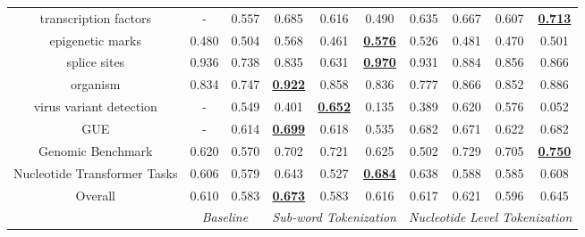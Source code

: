 \begin{table*}[]
\begin{center}
\begin{tabular}{@{}c|cc|ccc|cccc@{}}
transcription factors & - & 0.557 & 0.685 & 0.616 & 0.490 & 0.635 & 0.667 & 0.607 & \textbf{\underline{0.713}} \\
epigenetic marks & 0.480 & 0.504 & 0.568 & 0.461 & \textbf{\underline{0.576}} & 0.526 & 0.481 & 0.470 & 0.501 \\
splice sites & 0.936 & 0.738 & 0.835 & 0.631 & \textbf{\underline{0.970}} & 0.931 & 0.884 & 0.856 & 0.866 \\
organism & 0.834 & 0.747 & \textbf{\underline{0.922}} & 0.858 & 0.836 & 0.777 & 0.866 & 0.852 & 0.886 \\
virus variant detection & - & 0.549 & 0.401 & \textbf{\underline{0.652}} & 0.135 & 0.389 & 0.620 & 0.576 & 0.052 \\
\midrule
GUE & - & 0.614 & \textbf{\underline{0.699}} & 0.618 & 0.535 & 0.682 & 0.671 & 0.622 & 0.682 \\
Genomic Benchmark & 0.620 & 0.570 & 0.702 & 0.721 & 0.625 & 0.502 & 0.729 & 0.705 & \textbf{\underline{0.750}} \\
Nucleotide Transformer Tasks & 0.606 & 0.579 & 0.643 & 0.527 & \textbf{\underline{0.684}} & 0.638 & 0.588 & 0.585 & 0.608 \\
\midrule
Overall & 0.610 & 0.583 & \textbf{\underline{0.673}} & 0.583 & 0.616 & 0.617 & 0.621 & 0.596 & 0.645 \\
\midrule
\multicolumn{1}{l|}{} & \multicolumn{2}{c|}{\textit{Baseline}} & \multicolumn{3}{c|}{\textit{Sub-word Tokenization}} & \multicolumn{4}{c}{\textit{Nucleotide Level Tokenization}}
\end{tabular}
\end{center}
\end{table*}